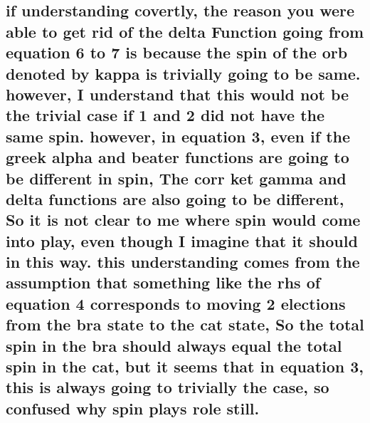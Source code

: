 \documentclass[12pt]{article}
\begin{document}
\subsection{if understanding covertly, the reason you were able to get rid of the delta Function going from equation 6 to 7 is because the spin of the orb denoted by kappa is trivially going to be same. however, I understand that this would not be the trivial case if 1 and 2 did not have the same spin. however, in equation 3, even if the greek alpha and beater functions are going to be different in spin, The corr ket gamma and delta functions are also going to be different, So it is not clear to me where spin would come into play, even though I imagine that it should in this way. this understanding comes from the assumption that something like the rhs of equation 4 corresponds to moving 2 elections from the bra state to the cat state, So the total spin in the bra should always equal the total spin in the cat, but it seems that in equation 3, this is always going to trivially the case, so confused why spin plays role still.}
\end{document}
